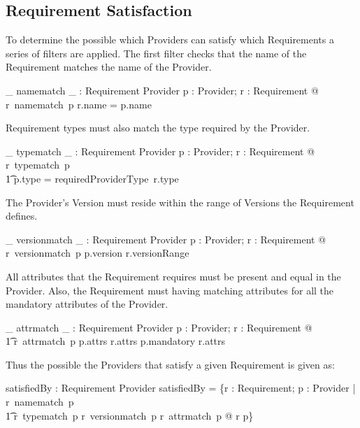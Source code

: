 \documentclass[a4paper,9pt]{article}
\begin{document}
\subsection*{Requirement Satisfaction}

To determine the possible which Providers can satisfy which Requirements a series of filters are applied. The first filter checks that the name of the Requirement matches the name of the Provider.

\begin{axdef}
\_ namematch \_ : Requirement \rel Provider
\where
\forall p : Provider; r : Requirement @ r~namematch~p \iff r.name = p.name
\end{axdef}

Requirement types must also match the type required by the Provider.

\begin{axdef}
\_ typematch \_ : Requirement \rel Provider
\where
\forall p : Provider; r : Requirement @ r~typematch~p \\
\t1 \iff p.type = requiredProviderType~r.type
\end{axdef}

The Provider's Version must reside within the range of Versions the Requirement defines.

\begin{axdef}
\_ versionmatch \_ : Requirement \rel Provider
\where
\forall p : Provider; r : Requirement @ r~versionmatch~p \iff p.version \in r.versionRange
\end{axdef}

All attributes that the Requirement requires must be present and equal in the Provider. Also, the Requirement must having matching attributes for all the mandatory attributes of the Provider.

\begin{axdef}
\_ attrmatch \_ : Requirement \rel Provider
\where
\forall p : Provider; r : Requirement @ \\
\t1 r~attrmatch~p \iff p.attrs \subseteq r.attrs \land p.mandatory \subseteq \dom r.attrs
\end{axdef}

Thus the possible the Providers that satisfy a given Requirement is given as:

\begin{axdef}
satisfiedBy : Requirement \rel Provider
\where
 satisfiedBy = \{r : Requirement; p : Provider | r~namematch~p \land \\
   \t1 r~typematch~p \land r~versionmatch~p \land r~attrmatch~p @ r \mapsto p\}
\end{axdef}
\end{document}

